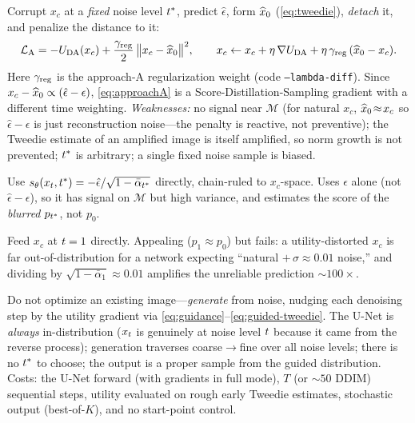 \begin{description}[leftmargin=1.6em,itemsep=2pt,topsep=2pt]
  \item[A --- L$_2$ penalty toward the Tweedie estimate.] Corrupt $x_{c}$ at a
        \emph{fixed} noise level $t^{*}$, predict $\hat\epsilon$, form $\widehat{x}_{0}$
        (\eqref{eq:tweedie}), \emph{detach} it, and penalize the distance to it:
        \begin{equation}
        \mathcal{L}_{\mathrm{A}}=-U_{\mathrm{DA}}(x_{c})+\frac{\gamma_{\mathrm{reg}}}{2}\,
           \big\lVert x_{c}-\widehat{x}_{0}\big\rVert^{2},
        \qquad
        x_{c}\leftarrow x_{c}+\eta\,\nabla U_{\mathrm{DA}}+\eta\,\gamma_{\mathrm{reg}}\,(\widehat{x}_{0}-x_{c}).
        \label{eq:approachA}
        \end{equation}
        Here $\gamma_{\mathrm{reg}}$ is the approach-A regularization weight (code
        \texttt{--lambda-diff}). Since $x_{c}-\widehat{x}_{0}\propto(\hat\epsilon-\epsilon)$,
        \eqref{eq:approachA} is a Score-Distillation-Sampling gradient with a
        different time weighting. \emph{Weaknesses:} no signal near $\mathcal{M}$
        (for natural $x_{c}$, $\widehat{x}_{0}\!\approx\!x_{c}$ so $\hat\epsilon-\epsilon$ is
        just reconstruction noise---the penalty is reactive, not preventive); the
        Tweedie estimate of an amplified image is itself amplified, so norm growth
        is not prevented; $t^{*}$ is arbitrary; a single fixed noise sample is
        biased.
  \item[B --- direct score.] Use $s_{\theta}(x_{t},t^{*})=-\hat\epsilon/\sqrt{1-
        \bar\alpha_{t^{*}}}$ directly, chain-ruled to $x_{c}$-space. Uses
        $\hat\epsilon$ alone (not $\hat\epsilon-\epsilon$), so it has signal on
        $\mathcal{M}$ but high variance, and estimates the score of the
        \emph{blurred} $p_{t^{*}}$, not $p_{0}$.
  \item[C --- score without added noise.] Feed $x_{c}$ at $t=1$ directly.
        Appealing ($p_{1}\!\approx\!p_{0}$) but fails: a utility-distorted $x_{c}$
        is far out-of-distribution for a network expecting ``natural $+\,\sigma\!
        \approx\!0.01$ noise,'' and dividing by $\sqrt{1-\bar\alpha_{1}}\!\approx\!
        0.01$ amplifies the unreliable prediction $\sim\!100\times$.
  \item[D --- full guided reverse diffusion (\emph{adopted}).] Do not optimize an
        existing image---\emph{generate} from noise, nudging each denoising step
        by the utility gradient via \eqref{eq:guidance}--\eqref{eq:guided-tweedie}.
        The U-Net is \emph{always} in-distribution ($x_{t}$ is genuinely at noise
        level $t$ because it came from the reverse process); generation
        traverses coarse$\to$fine over all noise levels; there is no $t^{*}$ to
        choose; the output is a proper sample from the guided distribution. Costs:
        the U-Net forward (with gradients in full mode), $T$ (or $\sim\!50$ DDIM)
        sequential steps, utility evaluated on rough early Tweedie estimates,
        stochastic output (best-of-$K$), and no start-point control.
\end{description}

